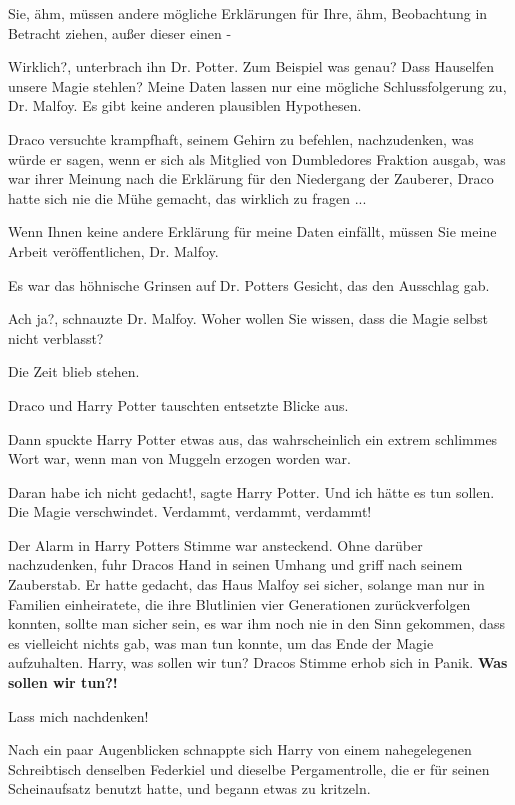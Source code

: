 \glqq{}Sie, ähm, müssen andere mögliche Erklärungen für Ihre, ähm, Beobachtung
in Betracht ziehen, außer dieser einen -\grqq{}

\glqq{}Wirklich?\grqq{}, unterbrach ihn Dr. Potter. \glqq{}Zum Beispiel was
genau? Dass Hauselfen unsere Magie stehlen? Meine Daten lassen nur eine mögliche
Schlussfolgerung zu, Dr. Malfoy. Es gibt keine anderen plausiblen
Hypothesen.\grqq{}

Draco versuchte krampfhaft, seinem Gehirn zu befehlen, nachzudenken, was würde
er sagen, wenn er sich als Mitglied von Dumbledores Fraktion ausgab, was war
ihrer Meinung nach die Erklärung für den Niedergang der Zauberer, Draco hatte
sich nie die Mühe gemacht, das wirklich zu fragen ...

\glqq{}Wenn Ihnen keine andere Erklärung für meine Daten einfällt, müssen Sie
meine Arbeit veröffentlichen, Dr. Malfoy.\grqq{}

Es war das höhnische Grinsen auf Dr. Potters Gesicht, das den Ausschlag gab.

\glqq{}Ach ja?\grqq{}, schnauzte Dr. Malfoy. \glqq{}Woher wollen Sie wissen,
dass die Magie selbst nicht verblasst?\grqq{}

Die Zeit blieb stehen.

Draco und Harry Potter tauschten entsetzte Blicke aus.

Dann spuckte Harry Potter etwas aus, das wahrscheinlich ein extrem schlimmes
Wort war, wenn man von Muggeln erzogen worden war.

\glqq{}Daran habe ich nicht gedacht!\grqq{}, sagte Harry Potter. \glqq{}Und ich
hätte es tun sollen. Die Magie verschwindet. Verdammt, verdammt,
verdammt!\grqq{}

Der Alarm in Harry Potters Stimme war ansteckend. Ohne darüber nachzudenken,
fuhr Dracos Hand in seinen Umhang und griff nach seinem Zauberstab. Er hatte
gedacht, das Haus Malfoy sei sicher, solange man nur in Familien einheiratete,
die ihre Blutlinien vier Generationen zurückverfolgen konnten, sollte man sicher
sein, es war ihm noch nie in den Sinn gekommen, dass es vielleicht nichts gab,
was man tun konnte, um das Ende der Magie aufzuhalten. \glqq{}Harry, was sollen
wir tun?\grqq{} Dracos Stimme erhob sich in Panik. \glqq{}\textbf{Was sollen wir
tun?!}\grqq{}

\glqq{}Lass mich nachdenken!\grqq{}

Nach ein paar Augenblicken schnappte sich Harry von einem nahegelegenen
Schreibtisch denselben Federkiel und dieselbe Pergamentrolle, die er für seinen
Scheinaufsatz benutzt hatte, und begann etwas zu kritzeln.

